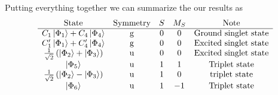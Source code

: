\documentclass[../Main/chem532-notes.tex]{subfiles}
\begin{document}
Putting everything together we can summarize the our results as
\begin{equation}
   \begin{array}{ccccc}
    \text{State} & \text{Symmetry} & S & M_S & \text{Note}\\
    \hline
    C_1 \ket{\Phi_1} + C_4 \ket{\Phi_4} & \mathrm{g} & 0 & 0 & \text{Ground singlet state}\\
    C'_1 \ket{\Phi_1} + C'_4 \ket{\Phi_4} & \mathrm{g} & 0 & 0 & \text{Excited singlet state} \\ 
    \frac{1}{\sqrt{2}} \left(  \ket{\Phi_2} + \ket{\Phi_3} \right) & \mathrm{u} & 0 & 0 & \text{Excited singlet state}\\
        \ket{\Phi_5} & \mathrm{u} & 1 & 1 & \text{Triplet state}\\    
        \frac{1}{\sqrt{2}} \left(  \ket{\Phi_2} - \ket{\Phi_3} \right) & \mathrm{u} & 1 & 0 & \text{triplet state}\\
        \ket{\Phi_6} & \mathrm{u} & 1 & -1 & \text{Triplet state}
   \end{array}
\end{equation}
\end{document}
